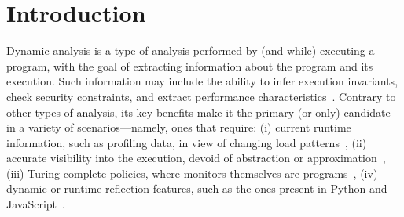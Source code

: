 \documentclass[letterpaper,twocolumn,10pt]{article}
\begin{document}
\begin{abstract}

\end{abstract}

\section{Introduction}
\label{intro}

Dynamic analysis is a type of analysis performed by (and while) executing a program, with the goal of extracting information about the program and its execution.
Such information may include the ability to infer execution invariants, check security constraints, and extract performance characteristics~\cite{analysis:10}.
Contrary to other types of analysis, its key benefits make it the primary (or only) candidate in a variety of scenarios---namely, ones that require:
  (i) current runtime information, such as profiling data, in view of changing load patterns~\cite{staticdynamic},
  (ii) accurate visibility into the execution, devoid of abstraction or approximation~\cite{staticdynamic},
  (iii) Turing-complete policies, where monitors themselves are programs~\cite{contracts1, contracts2, contracts3},
  (iv) dynamic or runtime-reflection features, such as the ones present in Python and JavaScript~\cite{jsanalysis1, jsanalysis2}.
\end{document}
